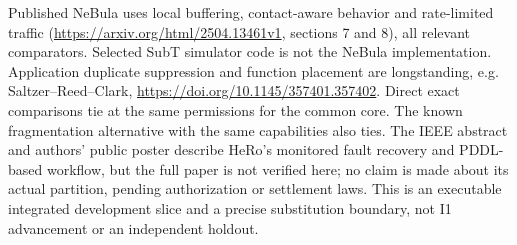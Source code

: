 \documentclass{article}
\begin{document}
Published NeBula uses local buffering, contact-aware behavior and
rate-limited traffic (\url{https://arxiv.org/html/2504.13461v1},
sections 7 and 8), all relevant comparators. Selected SubT simulator
code is not the NeBula implementation. Application duplicate suppression
and function placement are longstanding, e.g. Saltzer--Reed--Clark,
\url{https://doi.org/10.1145/357401.357402}. Direct exact comparisons tie at
the same permissions for the common core. The known fragmentation
alternative with the same capabilities also ties. The IEEE abstract and
authors' public poster describe HeRo's monitored fault recovery and
PDDL-based workflow, but the full paper is not verified here; no claim is
made about its actual partition, pending authorization or settlement laws.
This is an executable integrated development slice and a precise
substitution boundary, not I1 advancement or an independent holdout.
\end{document}
